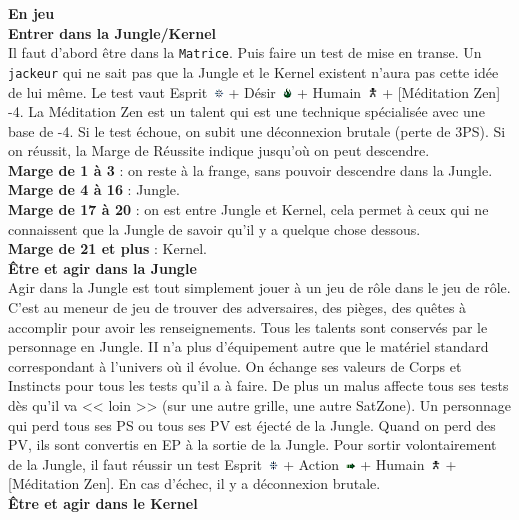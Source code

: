\documentclass[11pt,twoside,a4paper]{article}
\def\imgESPRI{\includegraphics[width=0.25cm]{../../../../../imgGraphics/rolePlayingGame/SimulacreS/mini12x12/esprit.png} }
\def\imgACTIO{\includegraphics[width=0.25cm]{../../../../../imgGraphics/rolePlayingGame/SimulacreS/mini12x12/action.png} }
\def\imgDESIR{\includegraphics[width=0.25cm]{../../../../../imgGraphics/rolePlayingGame/SimulacreS/mini12x12/desir.png} }
\def\imgHUMAI{\includegraphics[width=0.25cm]{../../../../../imgGraphics/rolePlayingGame/SimulacreS/mini12x12/humain.png} }
\begin{document}
\begin{multicols}{3}
{	\textbf{\Large En jeu}~\\
	
	\textbf{\large Entrer dans la Jungle/Kernel}~\\
	
	Il faut d'abord {\^e}tre dans la \texttt{Matrice}. Puis faire un test de mise en transe. Un \texttt{jackeur} qui ne sait pas que la Jungle et le Kernel existent n'aura pas cette id{\'e}e de lui m{\^e}me. Le test vaut Esprit~\imgESPRI + D{\'e}sir~\imgDESIR + Humain~\imgHUMAI + [M{\'e}ditation Zen] -4. La M{\'e}ditation Zen est un talent qui est une technique sp{\'e}cialis{\'e}e avec une base de -4. Si le test {\'e}choue, on subit une d{\'e}connexion brutale (perte de 3PS). Si on r{\'e}ussit, la Marge de R{\'e}ussite indique jusqu'o{\`u} on peut descendre.~\\
	\textbf{Marge de 1 {\`a} 3} : on reste {\`a} la frange, sans pouvoir descendre dans la Jungle.~\\
	\textbf{Marge de 4 {\`a} 16} : Jungle. ~\\
	\textbf{Marge de 17 {\`a} 20} : on est entre Jungle et Kernel, cela permet {\`a} ceux qui ne connaissent que la Jungle de savoir qu'il y a quelque chose dessous.~\\
	\textbf{Marge de 21 et plus} : Kernel.~\\
	
	\textbf{\large {\^E}tre et agir dans la Jungle}~\\
	
	Agir dans la Jungle est tout simplement jouer {\`a} un jeu de r{\^o}le dans le jeu de r{\^o}le. C'est au meneur de jeu de trouver des adversaires, des pi{\`e}ges, des qu{\^e}tes {\`a} accomplir pour avoir les renseignements. Tous les talents sont conserv{\'e}s par le personnage en Jungle. II n'a plus d'{\'e}quipement autre que le mat{\'e}riel standard correspondant {\`a} l'univers o{\`u} il {\'e}volue. On {\'e}change ses valeurs de Corps et Instincts pour tous les tests qu'il a {\`a} faire. De plus un malus affecte tous ses tests d{\`e}s qu'il va << loin >> (sur une autre grille, une autre SatZone). Un personnage qui perd tous ses PS ou tous ses PV est {\'e}ject{\'e} de la Jungle. Quand on perd des PV, ils sont convertis en EP {\`a} la sortie de la Jungle. Pour sortir volontairement de la Jungle, il faut r{\'e}ussir un test Esprit~\imgESPRI + Action~\imgACTIO + Humain~\imgHUMAI + [M{\'e}ditation Zen]. En cas d'{\'e}chec, il y a d{\'e}connexion brutale.~\\
	
	\textbf{\large {\^E}tre et agir dans le Kernel}~\\
	
}
\end{multicols}
\end{document}
